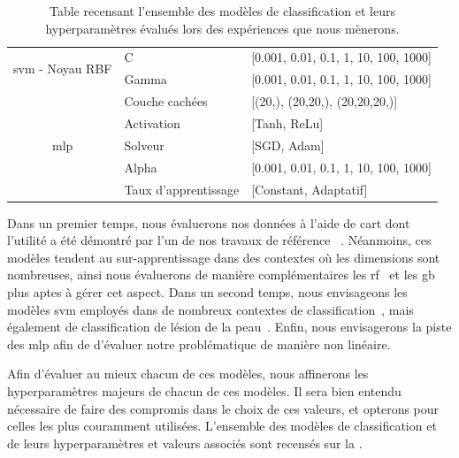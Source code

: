\begin{table}[H]
\begin{tabular}{cll}
        \multirow{2}{*}{\gls{svm} - Noyau RBF}          & C                         & [0.001, 0.01, 0.1, 1, 10, 100, 1000]      \\ \cmidrule{2-3}   
                                                        & Gamma                     & [0.001, 0.01, 0.1, 1, 10, 100, 1000]      \\ \midrule 
        \multirow{5}{*}{\gls{mlp}}                      & Couche cachées            & [(20,), (20,20,), (20,20,20,)]            \\ \cmidrule{2-3}
                                                        & Activation                & [Tanh, ReLu]                              \\ \cmidrule{2-3}
                                                        & Solveur                   & [SGD, Adam]                               \\ \cmidrule{2-3}
                                                        & Alpha                     & [0.001, 0.01, 0.1, 1, 10, 100, 1000]      \\ \cmidrule{2-3}
                                                        & Taux d'apprentissage      & [Constant, Adaptatif]                     \\ \bottomrule 
    \end{tabular} 
    \caption{Table recensant l'ensemble des modèles de classification et leurs hyperparamètres évalués lors des expériences que nous mènerons.}
    \label{tab:image_classification_models_hyperparameters}
\end{table}\par

Dans un premier temps, nous évaluerons nos données à l'aide de \gls{cart} dont l'utilité a été démontré par l'un de nos travaux de référence ~\cite{Wiltgen2008}. Néanmoins, ces modèles tendent au sur-apprentissage dans des contextes où les dimensions sont nombreuses, ainsi nous évaluerons de manière complémentaires les \gls{rf}~\cite{Breiman2001} et les \gls{gb} plus aptes à gérer cet aspect. Dans un second temps, nous envisageons les modèles \gls{svm} employés dans de nombreux contextes de classification~\cite{Smach2008a}, mais également de classification de lésion de la peau~\cite{Celebi2007}. Enfin, nous envisagerons la piste des \gls{mlp} afin de d'évaluer notre problématique de manière non linéaire.\par

Afin d'évaluer au mieux chacun de ces modèles, nous affinerons les hyperparamètres majeurs de chacun de ces modèles. Il sera bien entendu nécessaire de faire des compromis dans le choix de ces valeurs, et opterons pour celles les plus couramment utilisées. L'ensemble des modèles de classification et de leurs hyperparamètres et valeurs associés sont recensés sur la .\par

